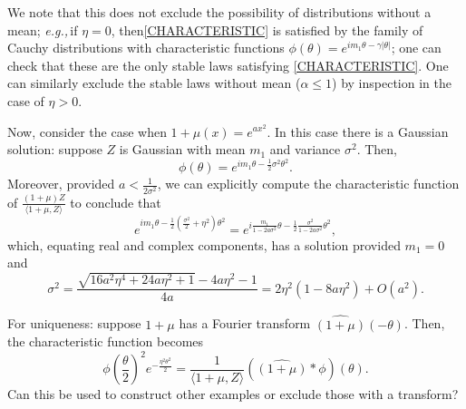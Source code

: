 \documentclass[11pt]{amsart}
\theoremstyle{remark}
\theoremstyle{definition}
\newcommand{\eg}{\textit{e.g.,}\,}
\begin{document}
We note that this does not exclude the possibility of distributions without a mean; \eg if $\eta =0$, then\eqref{CHARACTERISTIC} is satisfied by the family of Cauchy distributions with characteristic functions $\phi(\theta) = e^{i m_{1} \theta - \gamma |\theta|}$; one can check that these are the only stable laws satisfying \eqref{CHARACTERISTIC}.  One can similarly exclude the stable laws without mean ($\alpha \leq 1$) by inspection in the case of $\eta > 0$. 

Now, consider the case when $1+ \mu(x) = e^{a x^{2}}$.  In this case there is a Gaussian solution: suppose $Z$ is Gaussian with mean $m_{1}$ and variance $\sigma^{2}$.  Then,
\[
	\phi(\theta) = e^{i m_{1} \theta - \frac{1}{2} \sigma^{2} \theta^{2}}.
\]
Moreover, provided $a < \frac{1}{2\sigma^{2}}$, we can explicitly compute the characteristic function of $\frac{(1+\mu) Z}{\langle 1+ \mu, Z \rangle}$ to conclude that
\[
	e^{i m_{1} \theta - \frac{1}{2} \left(\frac{\sigma^{2}}{2} + \eta^{2}\right)\theta^{2}}
	= e^{i \frac{m_{1}}{1-2 a \sigma^{2}}\theta 
		- \frac{1}{2} \frac{\sigma^{2}}{1-2 a \sigma^{2}}\theta^{2}},
\]
which, equating real and complex components, has a solution provided $m_{1} = 0$ and
\[
	\sigma^{2} = \frac{\sqrt{16 a^{2} \eta^{4} + 24 a \eta^{2}+1} - 4a \eta^{2} -1}{4a} 
	=  2\eta^{2}(1-8a\eta^{2}) + O(a^{2}).
\]

For uniqueness: suppose $1+\mu$ has a Fourier transform $\widehat{(1+\mu)}(-\theta)$. Then, the characteristic function becomes 
\[
	{\textstyle \phi\left(\frac{\theta}{2}\right)^{2}} e^{-\frac{\eta^{2}\theta^{2}}{2}} = 
	\frac{1}{\langle 1+\mu, Z\rangle} (\widehat{(1+\mu)} * \phi)(\theta).
\]
Can this be used to construct other examples or exclude those with a transform?



\end{document}
